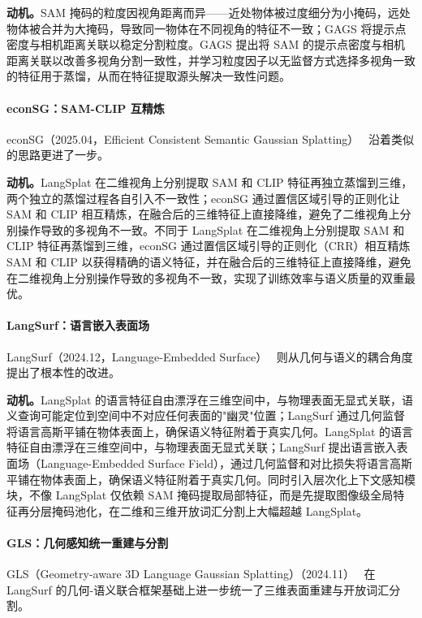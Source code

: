 \textbf{动机。}SAM 掩码的粒度因视角距离而异——近处物体被过度细分为小掩码，远处物体被合并为大掩码，导致同一物体在不同视角的特征不一致；GAGS 将提示点密度与相机距离关联以稳定分割粒度。GAGS 提出将 SAM 的提示点密度与相机距离关联以改善多视角分割一致性，并学习粒度因子以无监督方式选择多视角一致的特征用于蒸馏，从而在特征提取源头解决一致性问题。

\paragraph{econSG：SAM-CLIP 互精炼} econSG（2025.04，Efficient Consistent Semantic Gaussian Splatting）~\cite{2504_06003} 沿着类似的思路更进了一步。

\textbf{动机。}LangSplat 在二维视角上分别提取 SAM 和 CLIP 特征再独立蒸馏到三维，两个独立的蒸馏过程各自引入不一致性；econSG 通过置信区域引导的正则化让 SAM 和 CLIP 相互精炼，在融合后的三维特征上直接降维，避免了二维视角上分别操作导致的多视角不一致。不同于 LangSplat 在二维视角上分别提取 SAM 和 CLIP 特征再蒸馏到三维，econSG 通过置信区域引导的正则化（CRR）相互精炼 SAM 和 CLIP 以获得精确的语义特征，并在融合后的三维特征上直接降维，避免在二维视角上分别操作导致的多视角不一致，实现了训练效率与语义质量的双重最优。

\paragraph{LangSurf：语言嵌入表面场} LangSurf（2024.12，Language-Embedded Surface）~\cite{2412_17635} 则从几何与语义的耦合角度提出了根本性的改进。

\textbf{动机。}LangSplat 的语言特征自由漂浮在三维空间中，与物理表面无显式关联，语义查询可能定位到空间中不对应任何表面的"幽灵"位置；LangSurf 通过几何监督将语言高斯平铺在物体表面上，确保语义特征附着于真实几何。LangSplat 的语言特征自由漂浮在三维空间中，与物理表面无显式关联；LangSurf 提出语言嵌入表面场（Language-Embedded Surface Field），通过几何监督和对比损失将语言高斯平铺在物体表面上，确保语义特征附着于真实几何。同时引入层次化上下文感知模块，不像 LangSplat 仅依赖 SAM 掩码提取局部特征，而是先提取图像级全局特征再分层掩码池化，在二维和三维开放词汇分割上大幅超越 LangSplat。

\paragraph{GLS：几何感知统一重建与分割} GLS（Geometry-aware 3D Language Gaussian Splatting）（2024.11）~\cite{2411_18066} 在 LangSurf 的几何-语义联合框架基础上进一步统一了三维表面重建与开放词汇分割。

